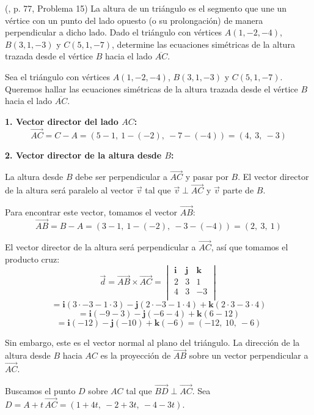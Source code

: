 \begin{prob} (\cite{espinoza2006Algebralineal}, p. 77, Problema 15) La altura de un triángulo es el segmento que une un vértice con un punto del lado opuesto (o su prolongación) de manera perpendicular a dicho lado. Dado el triángulo con vértices $A(1,-2,-4)$, $B(3,1,-3)$ y $C(5,1,-7)$, determine las ecuaciones simétricas de la altura trazada desde el vértice $B$ hacia el lado $\overline{AC}$. 
\begin{myproof}
Sea el triángulo con vértices $A(1,-2,-4)$, $B(3,1,-3)$ y $C(5,1,-7)$. Queremos hallar las ecuaciones simétricas de la altura trazada desde el vértice $B$ hacia el lado $\overline{AC}$.

\textbf{1. Vector director del lado $AC$:}
\[
\vec{AC} = C - A = (5-1,\ 1-(-2),\ -7-(-4)) = (4,\ 3,\ -3)
\]

\textbf{2. Vector director de la altura desde $B$:}

La altura desde $B$ debe ser perpendicular a $\overrightarrow{AC}$ y pasar por $B$.  
El vector director de la altura será paralelo al vector $\vec{v}$ tal que $\vec{v} \perp \vec{AC}$ y $\vec{v}$ parte de $B$.

Para encontrar este vector, tomamos el vector $\overrightarrow{AB}$:
\[
\overrightarrow{AB} = B - A = (3-1,\ 1-(-2),\ -3-(-4)) = (2,\ 3,\ 1)
\]

El vector director de la altura será perpendicular a $\vec{AC}$, así que tomamos el producto cruz:
\[
\vec{d} = \overrightarrow{AB} \times \overrightarrow{AC}
= \begin{vmatrix}
\mathbf{i} & \mathbf{j} & \mathbf{k} \\
2 & 3 & 1 \\
4 & 3 & -3 \\
\end{vmatrix}
\]
\[
= \mathbf{i}(3 \cdot -3 - 1 \cdot 3) - \mathbf{j}(2 \cdot -3 - 1 \cdot 4) + \mathbf{k}(2 \cdot 3 - 3 \cdot 4)
\]
\[
= \mathbf{i}(-9 - 3) - \mathbf{j}(-6 - 4) + \mathbf{k}(6 - 12)
\]
\[
= \mathbf{i}(-12) - \mathbf{j}(-10) + \mathbf{k}(-6)
= (-12,\ 10,\ -6)
\]

Sin embargo, este es el vector normal al plano del triángulo.  
La dirección de la altura desde $B$ hacia $AC$ es la proyección de $\overrightarrow{AB}$ sobre un vector perpendicular a $\vec{AC}$.

Buscamos el punto $D$ sobre $AC$ tal que $\overrightarrow{BD} \perp \overrightarrow{AC}$.  
Sea $D = A + t\,\overrightarrow{AC} = (1 + 4t,\ -2 + 3t,\ -4 - 3t)$.


\end{myproof}
\end{prob}
